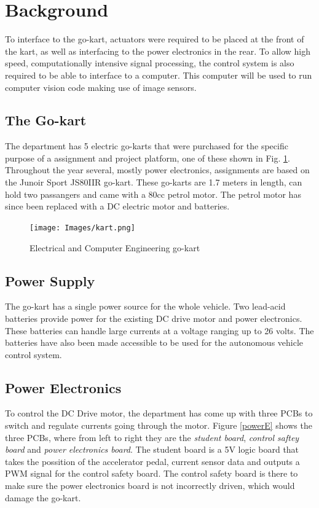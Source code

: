 \section{Background}
  To interface to the go-kart, actuators were required to be placed at the front
  of the kart, as well as interfacing to the power electronics in the rear. To
  allow high speed, computationally intensive signal processing, the control
  system is also required to be able to interface to a computer. This computer
  will be used to run computer vision code making use of image sensors.

\subsection{The Go-kart}
  The department has 5 electric go-karts that were purchased for the specific
  purpose of a assignment and project platform, one of these shown in Fig.
  \ref{go-kart}. Throughout the year several, mostly power electronics,
  assignments are based on the Junoir Sport JS80IIR go-kart. These go-karts are
  1.7 meters in length, can hold two passangers and came with a 80cc petrol
  motor. The petrol motor has since been replaced with a DC electric motor and
  batteries.

  \begin{figure}[h]
      \centering
      \texttt{[image: Images/kart.png]}
      \caption[Junoir Sport - JS80IIR go-kart]{Electrical and Computer
      Engineering go-kart}
      \label{go-kart}
  \end{figure}


\subsection{Power Supply}
  The go-kart has a single power source for the whole vehicle. Two lead-acid
  batteries provide power for the existing DC drive motor and power electronics.
  These batteries can handle large currents at a voltage ranging up to 26 volts.
  The batteries have also been made accessible to be used for the autonomous
  vehicle control system.

\subsection{Power Electronics}
  To control the DC Drive motor, the department has come up with three PCBs to
  switch and regulate currents going through the motor. Figure \ref{powerE}
  shows the three PCBs, where from left to right they are the \emph{student
  board}, \emph{control saftey board} and \emph{power electronics board}. The
  student board is a 5V logic board that takes the possition of the accelerator
  pedal, current sensor data and outputs a PWM signal for the control safety
  board. The control safety board is there to make sure the power electronics
  board is not incorrectly driven, which would damage the go-kart.

